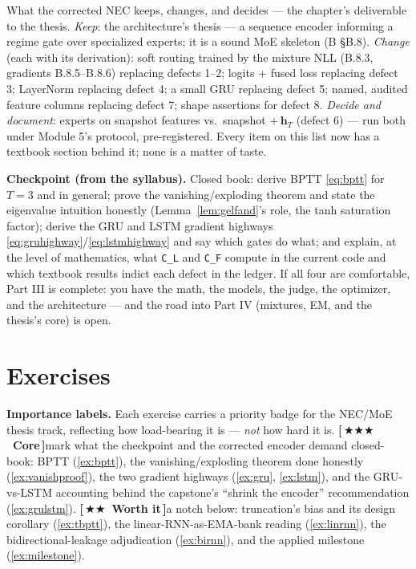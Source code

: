 \documentclass[11pt]{article}
\numberwithin{equation}{section}
\theoremstyle{plain}
\theoremstyle{definition}
\theoremstyle{remark}
\newcounter{exercise}
\newcommand{\prioCore}{{\normalfont\small\textbf{\textcolor{necblue}{[\,\ensuremath{\bigstar\bigstar\bigstar}\ Core\,]}}}\hspace{0.5em}}
\newcommand{\prioWorth}{{\normalfont\small\textbf{\textcolor{finmaroon}{[\,\ensuremath{\bigstar\bigstar}\ Worth it\,]}}}\hspace{0.5em}}
\newcommand{\bh}{\bm{h}}
\begin{document}
\begin{necbox}
What the corrected NEC keeps, changes, and decides --- the chapter's deliverable to the thesis. \emph{Keep}: the architecture's thesis --- a sequence encoder informing a regime gate over specialized experts; it is a sound MoE skeleton (B \S B.8). \emph{Change} (each with its derivation): soft routing trained by the mixture NLL (B.8.3, gradients B.8.5--B.8.6) replacing defects 1--2; logits + fused loss replacing defect 3; LayerNorm replacing defect 4; a small GRU replacing defect 5; named, audited feature columns replacing defect 7; shape assertions for defect 8. \emph{Decide and document}: experts on snapshot features vs.\ snapshot $+\, \bh_T$ (defect 6) --- run both under Module 5's protocol, pre-registered. Every item on this list now has a textbook section behind it; none is a matter of taste.
\end{necbox}

\medskip
\noindent\textbf{Checkpoint (from the syllabus).} Closed book: derive BPTT \eqref{eq:bptt} for $T = 3$ and in general; prove the vanishing/exploding theorem and state the eigenvalue intuition honestly (Lemma~\ref{lem:gelfand}'s role, the tanh saturation factor); derive the GRU and LSTM gradient highways \eqref{eq:gruhighway}/\eqref{eq:lstmhighway} and say which gates do what; and explain, at the level of mathematics, what \texttt{C\_L} and \texttt{C\_F} compute in the current code and which textbook results indict each defect in the ledger. If all four are comfortable, Part III is complete: you have the math, the models, the judge, the optimizer, and the architecture --- and the road into Part IV (mixtures, EM, and the thesis's core) is open.

\section{Exercises}\label{sec:exercises}

\noindent\textbf{Importance labels.} Each exercise carries a priority badge for the NEC/MoE thesis track, reflecting how load-bearing it is --- \emph{not} how hard it is. \prioCore mark what the checkpoint and the corrected encoder demand closed-book: BPTT (\ref{ex:bptt}), the vanishing/exploding theorem done honestly (\ref{ex:vanishproof}), the two gradient highways (\ref{ex:gru}, \ref{ex:lstm}), and the GRU-vs-LSTM accounting behind the capstone's ``shrink the encoder'' recommendation (\ref{ex:grulstm}). \prioWorth a notch below: truncation's bias and its design corollary (\ref{ex:tbptt}), the linear-RNN-as-EMA-bank reading (\ref{ex:linrnn}), the bidirectional-leakage adjudication (\ref{ex:birnn}), and the applied milestone (\ref{ex:milestone}).
\end{document}
